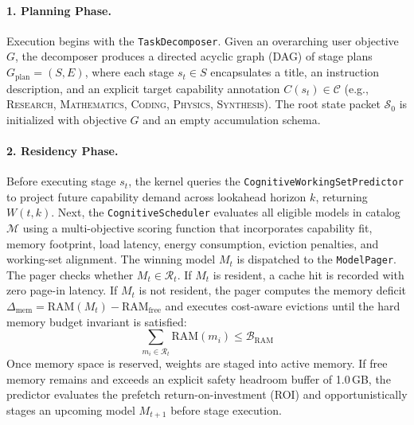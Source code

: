 \paragraph{1. Planning Phase.}
Execution begins with the \texttt{TaskDecomposer}. Given an overarching user objective $G$, the decomposer produces a directed acyclic graph (DAG) of stage plans $G_{\text{plan}} = (S, E)$, where each stage $s_t \in S$ encapsulates a title, an instruction description, and an explicit target capability annotation $C(s_t) \in \mathcal{C}$ (e.g., \textsc{Research}, \textsc{Mathematics}, \textsc{Coding}, \textsc{Physics}, \textsc{Synthesis}). The root state packet $\mathcal{S}_0$ is initialized with objective $G$ and an empty accumulation schema.

\paragraph{2. Residency Phase.}
Before executing stage $s_t$, the kernel queries the \texttt{CognitiveWorkingSetPredictor} to project future capability demand across lookahead horizon $k$, returning $W(t, k)$. Next, the \texttt{CognitiveScheduler} evaluates all eligible models in catalog $\mathcal{M}$ using a multi-objective scoring function that incorporates capability fit, memory footprint, load latency, energy consumption, eviction penalties, and working-set alignment. The winning model $M_t$ is dispatched to the \texttt{ModelPager}. The pager checks whether $M_t \in \mathcal{R}_t$. If $M_t$ is resident, a cache hit is recorded with zero page-in latency. If $M_t$ is not resident, the pager computes the memory deficit $\Delta_{\text{mem}} = \text{RAM}(M_t) - \text{RAM}_{\text{free}}$ and executes cost-aware evictions until the hard memory budget invariant is satisfied:
\begin{equation}
\sum_{m_i \in \mathcal{R}_t} \text{RAM}(m_i) \le \mathcal{B}_{\text{RAM}}
\end{equation}
Once memory space is reserved, weights are staged into active memory. If free memory remains and exceeds an explicit safety headroom buffer of 1.0\,GB, the predictor evaluates the prefetch return-on-investment (ROI) and opportunistically stages an upcoming model $M_{t+1}$ before stage execution.

